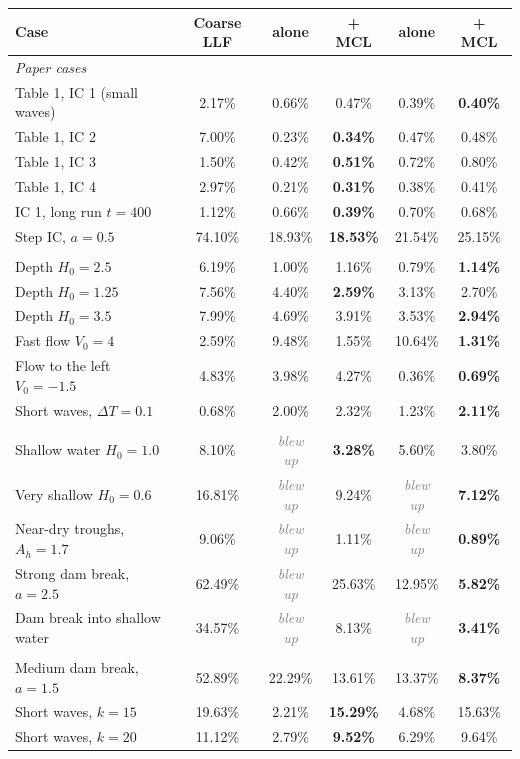 \begin{tabular}{@{}lccccc@{}}
\toprule
Case & Coarse LLF & \paper{} alone & \paper{} + MCL & \ours{} alone & \ours{} + MCL \\ \midrule
\multicolumn{6}{l}{\textit{Paper cases}} \\
Table 1, IC 1 (small waves) & 2.17\% & 0.66\% & 0.47\% & 0.39\% & \textbf{0.40\%} \\
Table 1, IC 2 & 7.00\% & 0.23\% & \textbf{0.34\%} & 0.47\% & 0.48\% \\
Table 1, IC 3 & 1.50\% & 0.42\% & \textbf{0.51\%} & 0.72\% & 0.80\% \\
Table 1, IC 4 & 2.97\% & 0.21\% & \textbf{0.31\%} & 0.38\% & 0.41\% \\
IC 1, long run $t{=}400$ & 1.12\% & 0.66\% & \textbf{0.39\%} & 0.70\% & 0.68\% \\
Step IC, $a{=}0.5$ & 74.10\% & 18.93\% & \textbf{18.53\%} & 21.54\% & 25.15\% \\
\addlinespace
\multicolumn{6}{l}{\textit{Outside the training range}} \\
Depth $H_0{=}2.5$ & 6.19\% & 1.00\% & 1.16\% & 0.79\% & \textbf{1.14\%} \\
Depth $H_0{=}1.25$ & 7.56\% & 4.40\% & \textbf{2.59\%} & 3.13\% & 2.70\% \\
Depth $H_0{=}3.5$ & 7.99\% & 4.69\% & 3.91\% & 3.53\% & \textbf{2.94\%} \\
Fast flow $V_0{=}4$ & 2.59\% & 9.48\% & 1.55\% & 10.64\% & \textbf{1.31\%} \\
Flow to the left $V_0{=}{-}1.5$ & 4.83\% & 3.98\% & 4.27\% & 0.36\% & \textbf{0.69\%} \\
Short waves, $\Delta T{=}0.1$ & 0.68\% & 2.00\% & 2.32\% & 1.23\% & \textbf{2.11\%} \\
\addlinespace
\multicolumn{6}{l}{\textit{Tough cases}} \\
Shallow water $H_0{=}1.0$ & 8.10\% & \textcolor{gray}{\textit{blew up}} & \textbf{3.28\%} & 5.60\% & 3.80\% \\
Very shallow $H_0{=}0.6$ & 16.81\% & \textcolor{gray}{\textit{blew up}} & 9.24\% & \textcolor{gray}{\textit{blew up}} & \textbf{7.12\%} \\
Near-dry troughs, $A_h{=}1.7$ & 9.06\% & \textcolor{gray}{\textit{blew up}} & 1.11\% & \textcolor{gray}{\textit{blew up}} & \textbf{0.89\%} \\
Strong dam break, $a{=}2.5$ & 62.49\% & \textcolor{gray}{\textit{blew up}} & 25.63\% & 12.95\% & \textbf{5.82\%} \\
Dam break into shallow water & 34.57\% & \textcolor{gray}{\textit{blew up}} & 8.13\% & \textcolor{gray}{\textit{blew up}} & \textbf{3.41\%} \\
\addlinespace
\multicolumn{6}{l}{\textit{Cases where the method breaks}} \\
Medium dam break, $a{=}1.5$ & 52.89\% & 22.29\% & 13.61\% & 13.37\% & \textbf{8.37\%} \\
Short waves, $k{=}15$ & 19.63\% & 2.21\% & \textbf{15.29\%} & 4.68\% & 15.63\% \\
Short waves, $k{=}20$ & 11.12\% & 2.79\% & \textbf{9.52\%} & 6.29\% & 9.64\% \\
\bottomrule
\end{tabular}
